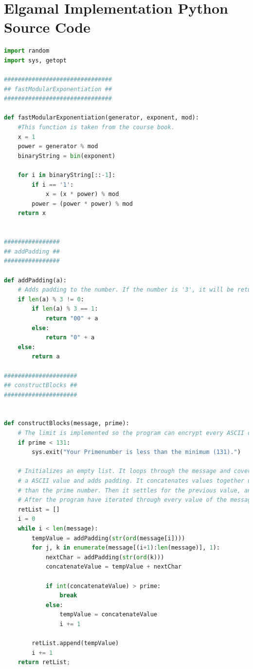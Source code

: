 \documentclass{article}
\begin{document}
\section{Elgamal Implementation Python Source Code}
\begin{lstlisting}[language=Python,breaklines=true,showspaces=false]
import random
import sys, getopt

###############################
## fastModularExponentiation ##
###############################

def fastModularExponentiation(generator, exponent, mod):
    #This function is taken from the course book.
    x = 1
    power = generator % mod
    binaryString = bin(exponent)

    for i in binaryString[::-1]:
        if i == '1':
            x = (x * power) % mod
        power = (power * power) % mod
    return x


################
## addPadding ##
################

def addPadding(a):
    # Adds padding to the number. If the number is '3', it will be returned as '003'.
    if len(a) % 3 != 0:
        if len(a) % 3 == 1:
            return "00" + a
        else:
            return "0" + a
    else:
        return a

#####################
## constructBlocks ##
#####################


def constructBlocks(message, prime):
    # The limit is implemented so the program can encrypt every ASCII character.
    if prime < 131:
        sys.exit("Your Primenumber is less than the minimum (131).")

    # Initializes an empty list. It loops through the message and coverts the character to
    # a ASCII value and adds padding. It concatenates values together until the value is larger
    # than the prime number. Then it settles for the previous value, and appends it to the list.
    # After the program have iterated through every value of the message, it returns the list.
    retList = []
    i = 0
    while i < len(message):
        tempValue = addPadding(str(ord(message[i])))
        for j, k in enumerate(message[(i+1):len(message)], 1):
            nextChar = addPadding(str(ord(k)))
            concatenateValue = tempValue + nextChar

            if int(concatenateValue) > prime:
                break
            else:
                tempValue = concatenateValue
                i += 1

        retList.append(tempValue)
        i += 1
    return retList;


\end{lstlisting}
\end{document}
